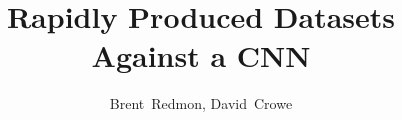\documentclass[12pt,journal,compsoc]{IEEEtran}
\begin{document}
%
\title{Rapidly Produced Datasets Against a CNN}
%
%
%
%

\author{Brent~Redmon,
        David~Crowe%
}

% 
%
\end{document}

